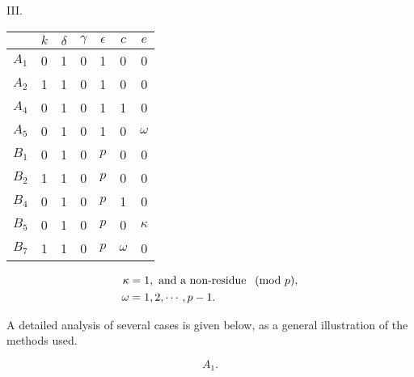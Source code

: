 \documentclass[oneside]{article}
\begin{document}
\begin{center}
\large III. \normalsize

\smallskip
\begin{tabular}{|c|c|c|c|c|c|c|} \hline
       & $k$ & $\delta$ & $\gamma$ & $\epsilon$ &    $c$   &    $e$   \\ \hline
 $A_1$ &  0  &     1    &    0     &      1     &     0    &     0    \\ \hline
 $A_2$ &  1  &     1    &    0     &      1     &     0    &     0    \\ \hline
 $A_4$ &  0  &     1    &    0     &      1     &     1    &     0    \\ \hline
 $A_5$ &  0  &     1    &    0     &      1     &     0    & $\omega$ \\ \hline
 $B_1$ &  0  &     1    &    0     &     $p$    &     0    &     0    \\ \hline
 $B_2$ &  1  &     1    &    0     &     $p$    &     0    &     0    \\ \hline
 $B_4$ &  0  &     1    &    0     &     $p$    &     1    &     0    \\ \hline
 $B_5$ &  0  &     1    &    0     &     $p$    &     0    & $\kappa$ \\ \hline
 $B_7$ &  1  &     1    &    0     &     $p$    & $\omega$ &     0    \\ \hline
\end{tabular}

\footnotesize
\begin{align*}
\kappa &= 1, \hbox { and a non-residue } \pmod{p}, \\
\omega &= 1, 2, \cdots, p - 1.
\end{align*}
\normalsize
\end{center}

A detailed analysis of several cases is given below, as a general
illustration of the methods used.

\medskip
\begin{equation*} A_1. \end{equation*}
\end{document}
